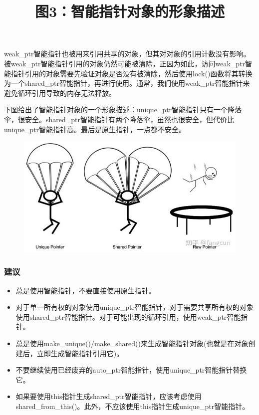 \documentclass{ctexart}
\begin{document}
weak\_ptr智能指针也被用来引用共享的对象，但其对对象的引用计数没有影响。被weak\_ptr智能指针引用的对象仍然可能被清除，正因为如此，访问weak\_ptr智能指针引用的对象需要先验证对象是否没有被清除，然后使用lock()函数将其转换为一个shared\_ptr智能指针，再进行使用。通常，我们使用weak\_ptr智能指针来避免循环引用导致的内存无法释放。

下图给出了智能指针对象的一个形象描述：unique\_ptr智能指针只有一个降落伞，很安全。shared\_ptr智能指针有两个降落伞，虽然也很安全，但代价比unique\_ptr智能指针高。最后是原生指针，一点都不安全。

\begin{figure}[H]
	\title{图3：智能指针对象的形象描述}
	\centering
	\includegraphics[scale=0.5]{img/1-3.jpg}
\end{figure}

\subsubsection*{建议}

\begin{itemize}
	\item 总是使用智能指针，不要直接使用原生指针。
	\item 对于单一所有权的对象使用unique\_ptr智能指针，对于需要共享所有权的对象使用shared\_ptr智能指针。对于可能出现的循环引用，使用weak\_ptr智能指针。
	\item 总是使用make\_unique()/make\_shared()来生成智能指针对象(也就是在对象创建后，立即生成智能指针引用它)。
	\item 不要继续使用已经废弃的auto\_ptr智能指针，使用unique\_ptr智能指针替换它。
	\item 如果要使用this指针生成shared\_ptr智能指针，应该考虑使用shared\_from\_this()。此外，不应该使用this指针生成unique\_ptr智能指针。
\end{itemize}
\end{document}
